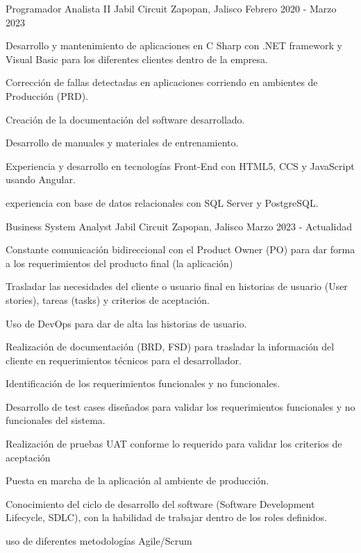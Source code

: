 \begin{cventries}
\cventry
{Programador Analista II} %
{Jabil Circuit} %
{Zapopan, Jalisco} %
{Febrero 2020 - Marzo 2023} %
{ %
\begin{cvitems}
\item {Desarrollo y mantenimiento de aplicaciones en C Sharp con .NET framework y Visual Basic para los diferentes clientes dentro de la empresa.}
\item{Corrección de fallas detectadas en aplicaciones corriendo en ambientes de Producción (PRD).}
\item{Creación de la documentación del software desarrollado.}
\item{Desarrollo de manuales y materiales de entrenamiento.}
\item{Experiencia y desarrollo en tecnologías Front-End con HTML5, CCS y JavaScript usando Angular.}
\item{experiencia con base de datos relacionales con SQL Server y PostgreSQL.}
\end{cvitems}
}


\cventry
{Business System Analyst} %
{Jabil Circuit} %
{Zapopan, Jalisco} %
{Marzo 2023 - Actualidad} %
{ %
\begin{cvitems}
\item {Constante comunicación bidireccional con el Product Owner (PO) para dar forma a los requerimientos del producto final (la aplicación)}
\item{Trasladar las necesidades del cliente o usuario final en historias de usuario (User stories), tareas (tasks) y criterios de aceptación.}
\item{Uso de DevOps para dar de alta las historias de usuario.}
\item{Realización de documentación (BRD, FSD) para trasladar la información del cliente en requerimientos técnicos para el desarrollador.}
\item{Identificación de los requerimientos funcionales y no funcionales.}
\item{Desarrollo de test cases diseñados para validar los requerimientos funcionales y no funcionales del sistema.}
\item {Realización de pruebas UAT conforme lo requerido para validar los criterios de aceptación}
\item{Puesta en marcha de la aplicación al ambiente de producción.}
\item{Conocimiento del ciclo de desarrollo del software (Software Development Lifecycle, SDLC), con la habilidad de trabajar dentro de los roles definidos.}
\item{uso de diferentes metodologías Agile/Scrum}
\end{cvitems} 
}






\end{cventries}